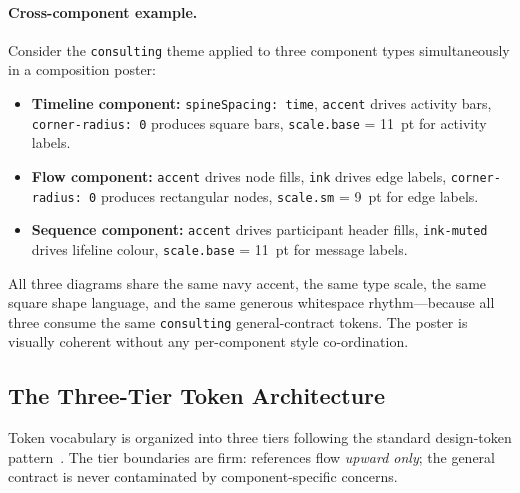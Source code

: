 \paragraph{Cross-component example.}
Consider the \texttt{consulting} theme applied to three component types simultaneously in a
composition poster:
\begin{itemize}
  \item \textbf{Timeline component:} \texttt{spineSpacing: time}, \texttt{accent} drives
        activity bars, \texttt{corner-radius: 0} produces square bars, \texttt{scale.base}
        = 11~pt for activity labels.
  \item \textbf{Flow component:} \texttt{accent} drives node fills, \texttt{ink} drives
        edge labels, \texttt{corner-radius: 0} produces rectangular nodes, \texttt{scale.sm}
        = 9~pt for edge labels.
  \item \textbf{Sequence component:} \texttt{accent} drives participant header fills,
        \texttt{ink-muted} drives lifeline colour, \texttt{scale.base} = 11~pt for
        message labels.
\end{itemize}
All three diagrams share the same navy accent, the same type scale, the same square shape
language, and the same generous whitespace rhythm---because all three consume the same
\texttt{consulting} general-contract tokens. The poster is visually coherent without any
per-component style co-ordination.

\subsection{The Three-Tier Token Architecture}
\label{sec:token-tiers}

Token vocabulary is organized into three tiers following the standard design-token
pattern~\cite{dtcg2024}. The tier boundaries are firm: references flow
\emph{upward only}; the general contract is never contaminated by component-specific
concerns.

